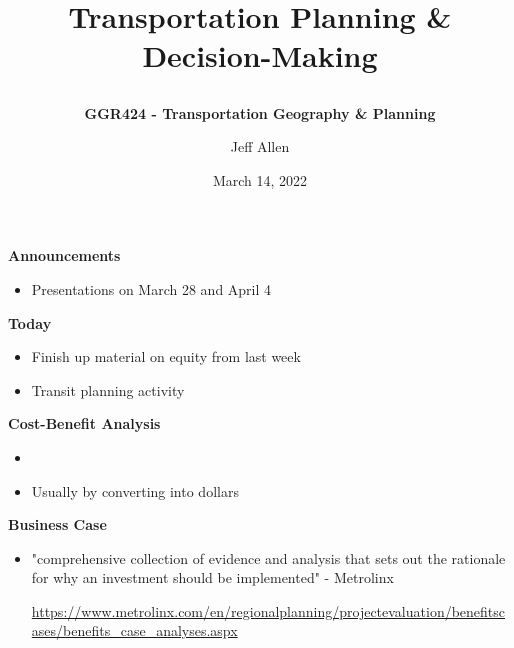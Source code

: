 \documentclass[aspectratio=169]{beamer}
\title{\textbf{Transportation Planning \& Decision-Making}
\subtitle{\textbf{GGR424 - Transportation Geography \& Planning}}
\author{Jeff Allen}
\institute{University of Toronto}
\date{March 14, 2022}}
\begin{document}
	
\begin{frame}
	\titlepage	
\end{frame}





\begin{frame}
	
	\textbf{Announcements}
	
	\begin{itemize}
		\item Presentations on March 28 and April 4
	\end{itemize}
	
	
	\textbf{Today}
	
	\begin{itemize}
		\item Finish up material on equity from last week
		\item Transit planning activity
		
	\end{itemize}
\end{frame}




\begin{frame}
	
	\textbf{Cost-Benefit Analysis}
	
	\begin{itemize}
		\item 
		\item Usually by converting into dollars
	\end{itemize}	
	
	\textbf{Business Case}
	
	\begin{itemize}
		\item "comprehensive
		collection of evidence and analysis
		that sets out the rationale for why an
		investment should be implemented" - Metrolinx
		
		\tiny\url{https://www.metrolinx.com/en/regionalplanning/projectevaluation/benefitscases/benefits_case_analyses.aspx}
	\end{itemize}
	
\end{frame}
\end{document}
